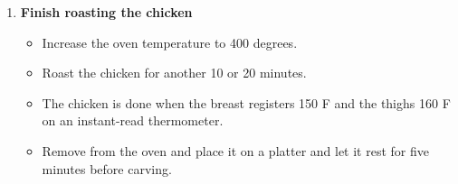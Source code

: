 \documentclass[11pt,letterpaper]{article}
\newcommand \fileName {ChickenWithALemon}
\begin{document}
\begin {description}
\begin{enumerate}
\item{\bf Finish roasting the chicken}
\begin{itemize}
\item Increase the oven temperature to 400 degrees.
\item Roast the chicken for another 10 or 20 minutes.
\item The chicken is done when the breast registers 150 F and the thighs 160 F on an instant-read thermometer.
\item Remove from the oven and place it on a platter and let it rest for  five minutes before carving.
\end{itemize}
\end{enumerate}
\end{description}


\end{document}
